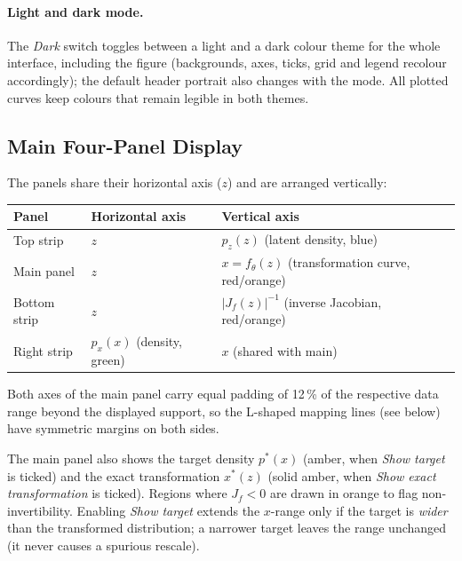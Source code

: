 \documentclass[11pt,a4paper]{article}
\newcommand{\pz}{p_z}
\newcommand{\px}{p_x}
\newcommand{\ft}{f_{\!\theta}}
\newcommand{\Jf}{J_{\!f}}
\begin{document}
\paragraph{Light and dark mode.}
The \emph{Dark} switch toggles between a light and a dark colour theme for the
whole interface, including the figure (backgrounds, axes, ticks, grid and
legend recolour accordingly); the default header portrait also changes with
the mode.  All plotted curves keep colours that remain legible in both themes.

\subsection{Main Four-Panel Display}

The panels share their horizontal axis ($z$) and are arranged vertically:

\begin{center}
\renewcommand{\arraystretch}{1.3}
\begin{tabular}{lll}
\toprule
Panel & Horizontal axis & Vertical axis \\
\midrule
Top strip  & $z$ & $\pz(z)$ (latent density, blue) \\
Main panel & $z$ & $x = \ft(z)$ (transformation curve, red/orange) \\
Bottom strip & $z$ & $|\Jf(z)|^{-1}$ (inverse Jacobian, red/orange) \\
Right strip  & $\px(x)$ (density, green) & $x$ (shared with main) \\
\bottomrule
\end{tabular}
\end{center}

Both axes of the main panel carry equal padding of 12\,\% of the
respective data range beyond the displayed support, so the L-shaped
mapping lines (see below) have symmetric margins on both sides.

The main panel also shows the target density $p^*(x)$ (amber, when
\emph{Show target} is ticked) and the exact transformation $x^*(z)$
(solid amber, when \emph{Show exact transformation} is ticked).
Regions where $\Jf < 0$ are drawn in orange to flag non-invertibility.
Enabling \emph{Show target} extends the $x$-range only if the target is
\emph{wider} than the transformed distribution; a narrower target leaves
the range unchanged (it never causes a spurious rescale).
\end{document}
